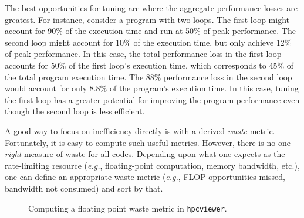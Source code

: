 \documentclass[12pt]{article}
\newcommand{\eg}{\emph{e.g.}}  %
\begin{document}
The best opportunities for tuning are where the aggregate performance losses are greatest. For instance, consider a program with two loops. 
The first loop might account for 90\% of the execution time and run at 50\% of peak performance. The second loop might account for 10\% of the execution time, but only achieve 12\% of peak performance. In this case, the total performance loss in the first loop accounts for 50\% of the first loop's execution time, which corresponds to 45\% of the total program execution time. The 88\% performance loss in the second loop would account for only 8.8\% of the program's execution time. In this case, tuning the first loop has a greater potential for improving the program performance even though the second loop is less efficient.

A good way to focus on inefficiency directly is with a derived {\em waste} metric.  Fortunately, it is easy to compute such useful metrics. However, there is no one {\em right} measure of waste for all codes. Depending upon what one expects as the rate-limiting resource (\eg, floating-point computation, 
memory bandwidth, etc.), one can define an appropriate waste metric (\eg, FLOP opportunities missed, bandwidth not consumed) and sort by that. 


\begin{figure}[t]
\caption{Computing a floating point waste metric in {\tt hpcviewer}.}
\label{fig:fpwaste}
\end{figure}
\end{document}
